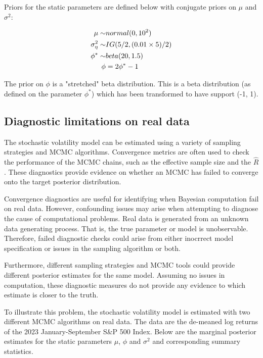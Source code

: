 \documentclass[12pt, a4paper]{article}
\begin{document}
    Priors for the static parameters are defined below with conjugate priors on $\mu$ and $\sigma^2$:

    $$
    \begin{aligned}
    \mu \sim& \space normal(0, 10^2) \\
    \sigma_{\eta}^2 \sim& \space IG(5/2, (0.01\times 5) / 2) \\
    \phi^{\ast} \sim& \space beta(20, 1.5) \\
    \phi &=  2\phi^{\ast} - 1
    \end{aligned}
    $$

    The prior on $\phi$ is a "stretched" beta distribution. This is a beta distribution (as defined on the parameter $\phi^*$) which has been transformed to have support (-1, 1).


\subsection{Diagnostic limitations on real data}
    The stochastic volatility model can be estimated using a variety of sampling strategies and MCMC algorithms. Convergence metrics are often used to check the performance of the MCMC chains, such as the effective sample size and the $\hat{R}$. These diagnostics provide evidence on whether an MCMC has failed to converge onto the target posterior distribution.

    Convergence diagnostics are useful for identifying when Bayesian computation fail on real data. However, confounding issues may arise when attempting to diagnose the cause of computational problems. Real data is generated from an unknown data generating process. That is, the true parameter or model is unobservable. Therefore, failed diagnostic checks could arise from either inocrrect model specification or issues in the sampling algorithm or both.

    Furthermore, different sampling strategies and MCMC tools could provide different posterior estimates for the same model. Assuming no issues in computation, these diagnostic measures do not provide any evidence to which estimate is closer to the truth.

    To illustrate this problem, the stochastic volatility model is estimated with two different MCMC algorithms on real data. The data are the de-meaned log returns of the 2023 January-September S\&P 500 Index. Below are the marginal posterior estimates for the static parameters $\mu$, $\phi$ and $\sigma^2$ and corresponding summary statistics.
\end{document}
